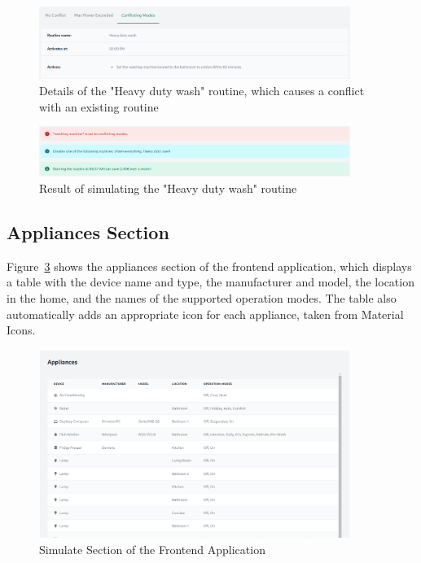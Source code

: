 \begin{figure}
    \centering
    \includegraphics[width=0.9\textwidth]{images/frontend/conflicting_modes.png}
    \caption{Details of the "Heavy duty wash" routine, which causes a conflict with an existing routine}
    \label{fig:frontend_conflicting_modes}
\end{figure}

\begin{figure}
    \centering
    \includegraphics[width=0.9\textwidth]{images/frontend/conflicting_modes_result.png}
    \caption{Result of simulating the "Heavy duty wash" routine}
    \label{fig:frontend_conflicting_modes_result}
\end{figure}

\subsection{Appliances Section}

Figure~\ref{fig:frontend_appliances} shows the appliances section of the frontend application, which displays a table with the device name and type, the manufacturer and model, the location in the home, and the names of the supported operation modes. The table also automatically adds an appropriate icon for each appliance, taken from Material Icons.

\begin{figure}
    \centering
    \includegraphics[width=0.9\textwidth]{images/frontend/appliances.png}
    \caption{Simulate Section of the Frontend Application}
    \label{fig:frontend_appliances}
\end{figure}

